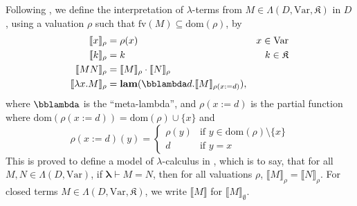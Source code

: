 \documentclass{lmcs}
\newcommand{\sembrack}[1]{\llbracket{#1}\rrbracket}
\newcommand{\dom}{\ensuremath{\mathrm{dom}}}
\newcommand{\Var}{\ensuremath{\mathrm{Var}}}
\newcommand{\lamth}{\boldsymbol{\lambda}} %
\newcommand{\fv}{\mathrm{fv}}
\newcommand{\lam}{\mathbf{lam}}
\newcommand{\Const}{\mathfrak{K}}
\begin{document}

\begin{defi}
	\label{LambdaInterpDef}
	Following \cite[Definition 5.4.2]{barendregt84}, we define the interpretation of $\lambda$-terms from $M \in \Lambda(D,\Var,\Const)$ in $D$, using a valuation $\rho$ such that $\fv(M) \subseteq \dom(\rho)$, by
	\begin{align*}
		\sembrack{x}_\rho &= \rho(x) & x \in \Var \\
		\sembrack{k}_\rho &= k & k \in \Const \\
		\sembrack{MN}_\rho &= \sembrack{M}_\rho \cdot \sembrack{N}_\rho \\
		\sembrack{\lambda x. M}_\rho &= \lam(\bblambda d. \sembrack{M}_{\rho(x := d)}),
	\end{align*}
	where $\bblambda$ is the ``meta-lambda'', and $\rho(x := d)$ is the partial function where $\dom(\rho(x:=d)) = \dom(\rho) \cup \{x\}$ and
	\[
	\rho(x:=d)(y) = \begin{cases} \rho(y) & \text{if } y \in \dom(\rho) \setminus \{x\} \\
		d &\text{if } y = x \end{cases}
	\]
	This is proved to define a model of $\lambda$-calculus in \cite[Theorem 5.4.4]{barendregt84}, which is to say, that for all $M, N \in \Lambda(D,\Var)$, if $\lamth \vdash M = N$, then for all valuations $\rho$, $\sembrack{M}_\rho = \sembrack{N}_\rho$. For closed terms $M \in \Lambda(D,\Var,\Const)$, we write $\sembrack{M}$ for $\sembrack{M}_\emptyset$. \qedhere
\end{defi}
\end{document}
